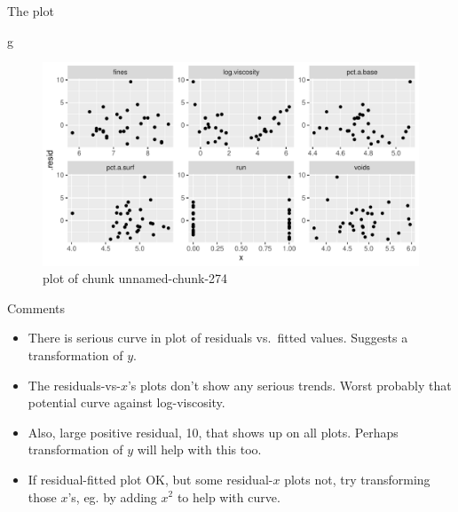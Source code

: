 \documentclass[ignorenonframetext,]{beamer}
\newenvironment{Shaded}{\begin{snugshade}}{\end{snugshade}}
\newcommand{\NormalTok}[1]{#1}
\providecommand{\tightlist}{%
  \setlength{\itemsep}{0pt}\setlength{\parskip}{0pt}}
\begin{document}
\begin{frame}[fragile]{The plot}
\protect\hypertarget{the-plot-3}{}

\begin{Shaded}
\begin{Highlighting}[]
\NormalTok{g}
\end{Highlighting}
\end{Shaded}

\begin{figure}
\centering
\includegraphics{figure/unnamed-chunk-274-1.pdf}
\caption{plot of chunk unnamed-chunk-274}
\end{figure}

\end{frame}

\begin{frame}{Comments}
\protect\hypertarget{comments-20}{}

\begin{itemize}
\tightlist
\item
  There is serious curve in plot of residuals vs.~fitted values.
  Suggests a transformation of \(y\).
\item
  The residuals-vs-\(x\)'s plots don't show any serious trends. Worst
  probably that potential curve against log-viscosity.
\item
  Also, large positive residual, 10, that shows up on all plots. Perhaps
  transformation of \(y\) will help with this too.
\item
  If residual-fitted plot OK, but some residual-\(x\) plots not, try
  transforming those \(x\)'s, eg. by adding \(x^2\) to help with curve.
\end{itemize}

\end{frame}
\end{document}
